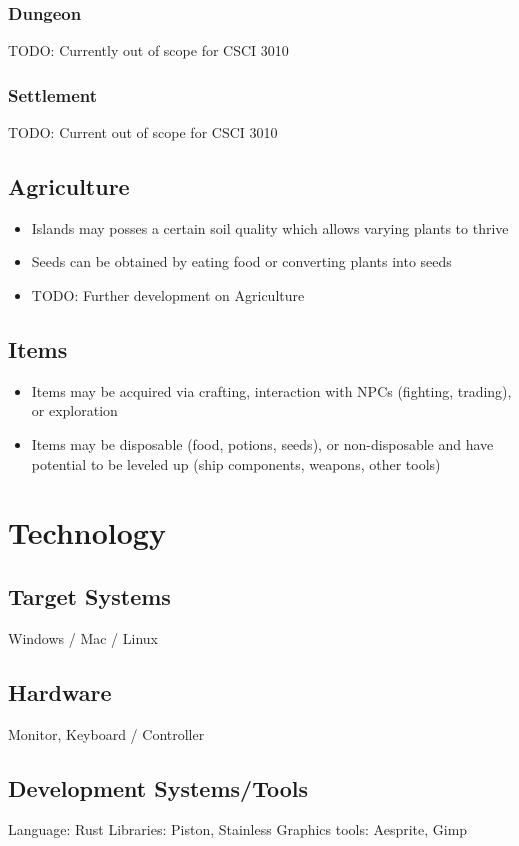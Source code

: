 \documentclass[a4paper]{scrreprt}
\begin{document}
\subsection{Dungeon}
TODO: Currently out of scope for CSCI 3010

\subsection{Settlement}
TODO: Current out of scope for CSCI 3010

\section{Agriculture}
\begin{itemize}
\item Islands may posses a certain soil quality which allows varying plants to thrive
\item Seeds can be obtained by eating food or converting plants into seeds
\item TODO: Further development on Agriculture
\end{itemize}

\section{Items}
\begin{itemize}
\item Items may be acquired via crafting, interaction with NPCs (fighting, trading), or exploration
\item Items may be disposable (food, potions, seeds), or non-disposable and have potential to be leveled up (ship components, weapons, other tools)
\end{itemize}





\chapter{Technology}

\section{Target Systems}
Windows / Mac / Linux

\section{Hardware}
Monitor, Keyboard / Controller

\section{Development Systems/Tools}
Language: Rust
\newline Libraries: Piston, Stainless
\newline Graphics tools: Aesprite, Gimp
\end{document}
